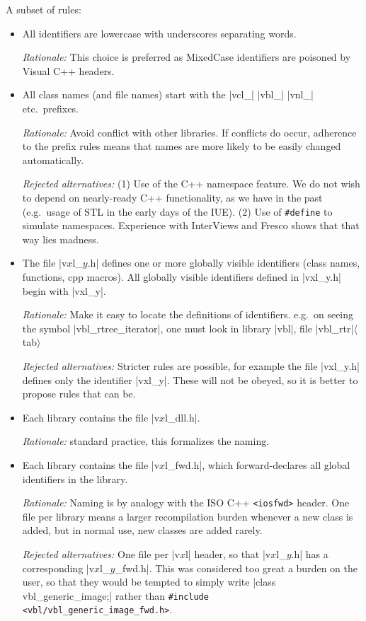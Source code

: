 \documentclass[11pt]{article}
\begin{document}
\def\vxl{|v$x$l}
A subset of rules:
\begin{itemize}
\item All identifiers are lowercase with underscores separating words.

{\em Rationale:}
This choice is preferred as MixedCase identifiers are poisoned by Visual
C++ headers.


\item All class names (and file names) start with the
|vcl_| |vbl_| |vnl_| etc.~prefixes.

{\em Rationale:} Avoid conflict with other libraries.  If conflicts do
occur, adherence to the prefix rules means that names are more likely to be
easily changed automatically.

{\em Rejected alternatives:} (1) Use of the C++ namespace feature.  We do
not wish to depend on nearly-ready C++ functionality, as we have in the
past (e.g.\ usage of STL in the early days of the IUE).  (2) Use of
\verb|#define| to simulate namespaces.  Experience with InterViews and
Fresco shows that that way lies madness.


\item The file \vxl_$y$.h| defines one or more globally visible identifiers
(class names, functions, cpp macros).
All globally visible identifiers defined in |vxl_y.h| begin with |vxl_y|.

{\em Rationale:} Make it easy to locate the definitions of
identifiers. e.g.\ on seeing the symbol |vbl_rtree_iterator|, one must look
in library |vbl|, file |vbl_rtr|$\langle${\sc tab}$\rangle$

{\em Rejected alternatives:}
Stricter rules are possible, for example the file |vxl_y.h| defines only the
identifier |vxl_y|.  These will not be obeyed, so it is better to propose
rules that can be.


\item Each library contains the file \vxl_dll.h|.

{\em Rationale:} standard practice, this formalizes the naming.


\item Each library contains the file \vxl_fwd.h|, which forward-declares
all global identifiers in the library.

{\em Rationale:} Naming is by analogy with the ISO C++ \verb|<iosfwd>|
header.  One file per library means a larger recompilation burden whenever
a new class is added, but in normal use, new classes are added rarely.

{\em Rejected alternatives:} One file per \vxl| header, so that \vxl_$y$.h|
has a corresponding \vxl_$y$_fwd.h|.  This was considered too great a
burden on the user, so that they would be tempted to simply write |class
vbl_generic_image;| rather than \verb|#include <vbl/vbl_generic_image_fwd.h>|.


\end{itemize}
\end{document}
